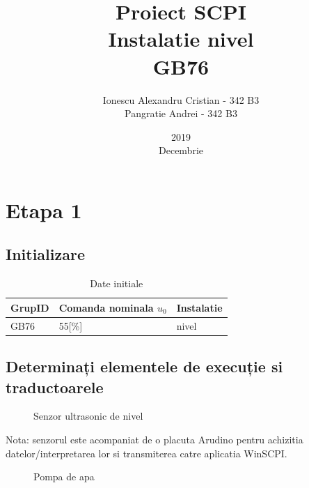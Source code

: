 \documentclass[12pt,english]{article}
\title{Proiect SCPI\\ Instalatie nivel\\ GB76}
\date{2019\\ Decembrie}
\author{Ionescu Alexandru Cristian - 342 B3\\Pangratie Andrei - 342 B3}
\begin{document}
\maketitle
\newpage

\tableofcontents
\newpage

\section {Etapa 1}
\subsection {Initializare}

\begin{table}[H]
  \centering
  \begin{tabular}{|l|l|l|}
    \hline
    GrupID & Comanda nominala $u_0$ & Instalatie \\
    \hline
    GB76 & 55[\%] & nivel \\
    \hline
  \end{tabular}
  \caption{Date initiale}
\end{table}

\subsection {Determinați elementele de execuție si traductoarele}
\begin{figure}[H]
  \centering
  \caption{Senzor ultrasonic de nivel}
\end{figure}

Nota: senzorul este acompaniat de o placuta Arudino pentru achizitia datelor/interpretarea lor si transmiterea catre aplicatia WinSCPI.

\begin{figure}[H]
  \centering
  \caption{Pompa de apa}
\end{figure}
\end{document}
